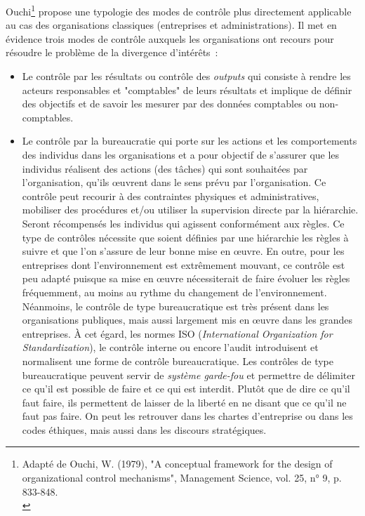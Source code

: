 \documentclass{tufte-handout}
\begin{document}
\begin{enumerate}
Ouchi\footnote{Adapté de Ouchi, W. (1979), "A conceptual framework for the design of organizational control mechanisms", Management Science, vol. 25, n° 9, p. 833-848.\\} propose une typologie des modes de contrôle plus directement applicable au cas des organisations classiques (entreprises et administrations). Il met en évidence trois modes de contrôle auxquels les organisations ont recours pour résoudre le problème de la divergence d'intérêts :\\
\begin{itemize}
\item Le contrôle par les résultats ou contrôle des \emph{outputs} qui consiste à rendre les acteurs responsables et "comptables" de leurs résultats et implique de définir des objectifs et de savoir les mesurer par des données comptables ou non-comptables.\\
\item Le contrôle par la bureaucratie qui porte sur les actions et les comportements des individus dans les organisations et a pour objectif de s'assurer que les individus réalisent des actions (des tâches) qui sont souhaitées par l'organisation, qu'ils œuvrent dans le sens prévu par l'organisation. Ce contrôle peut recourir à des contraintes physiques et administratives, mobiliser des procédures et/ou utiliser la supervision directe par la hiérarchie. Seront récompensés les individus qui agissent conformément aux règles. Ce type de contrôles nécessite que soient définies par une hiérarchie les règles à suivre et que l'on s'assure de leur bonne mise en œuvre. En outre, pour les entreprises dont l'environnement est extrêmement mouvant, ce contrôle est peu adapté puisque sa mise en œuvre nécessiterait de faire évoluer les règles fréquemment, au moins au rythme du changement de l'environnement. Néanmoins, le contrôle de type bureaucratique est très présent dans les organisations publiques, mais aussi largement mis en œuvre dans les grandes entreprises. À cet égard, les normes ISO (\emph{International Organization for Standardization}), le contrôle interne ou encore l'audit introduisent et normalisent une forme de contrôle bureaucratique. Les contrôles de type bureaucratique peuvent servir de \emph{système garde-fou} et permettre de délimiter ce qu'il est possible de faire et ce qui est interdit. Plutôt que de dire ce qu'il faut faire, ils permettent de laisser de la liberté en ne disant que ce qu'il ne faut pas faire. On peut les retrouver dans les chartes d'entreprise ou dans les codes éthiques, mais aussi dans les discours stratégiques.\\

\end{itemize}
\end{enumerate}
\end{document}
